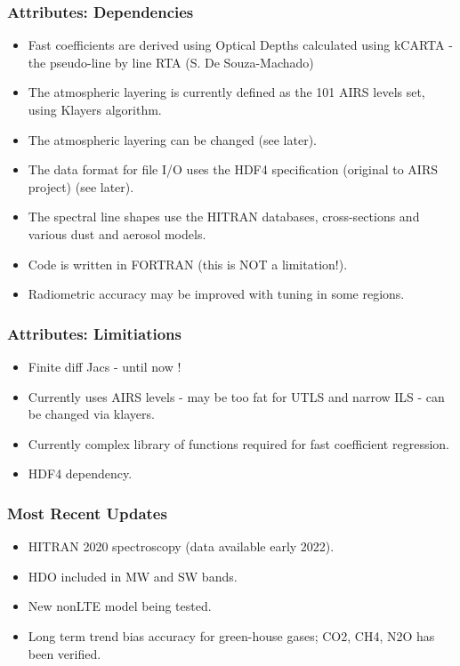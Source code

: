 \documentclass[10pt,t]{beamer}
\begin{document}
\begin{frame}
  \frametitle{Attributes: Dependencies}
  \begin{itemize}
    \item Fast coefficients are derived using Optical Depths calculated using kCARTA - the pseudo-line by line
    RTA (S. De Souza-Machado)
    \item The atmospheric layering is currently defined as the 101 AIRS levels set, using Klayers algorithm.
    \item The atmospheric layering can be changed (see later).
    \item The data format for file I/O uses the HDF4 specification (original to AIRS project) (see later).
    \item The spectral line shapes use the HITRAN databases, cross-sections and various dust and aerosol models.
    \item Code is written in FORTRAN (this is NOT a limitation!).
    \item Radiometric accuracy may be improved with tuning in some regions.
  \end{itemize}
\end{frame}

\begin{frame}
  \frametitle{Attributes: Limitiations}
  \begin{itemize}
  \item Finite diff Jacs - until now !
  \item Currently uses AIRS levels - may be too fat for UTLS and narrow ILS - can be changed
    via klayers.
  \item Currently complex library of functions required for fast coefficient regression.
  \item HDF4 dependency. 
  \end{itemize}
\end{frame}

\begin{frame}
  \frametitle{Most Recent Updates}
  \begin{itemize}
    \item HITRAN 2020 spectroscopy (data available early 2022).
    \item HDO included in MW and SW bands.
    \item New nonLTE model being tested.
    \item Long term trend bias accuracy for green-house gases; CO2, CH4, N2O has been verified.
  \end{itemize}
\end{frame}
\end{document}
